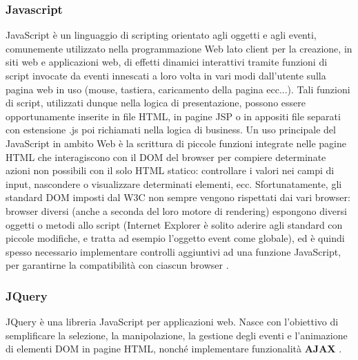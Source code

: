 \subsubsection{Javascript}
JavaScript è un linguaggio di scripting orientato agli oggetti e agli eventi, comunemente utilizzato nella programmazione Web lato client per la creazione, in siti web e applicazioni web, di effetti dinamici interattivi tramite funzioni di script invocate da eventi innescati a loro volta in vari modi dall'utente sulla pagina web in uso (mouse, tastiera, caricamento della pagina ecc...).
\newline
Tali funzioni di script, utilizzati dunque nella logica di presentazione, possono essere opportunamente inserite in file HTML, in pagine JSP o in appositi file separati con estensione .js poi richiamati nella logica di business. 
\newline
Un uso principale del JavaScript in ambito Web è la scrittura di piccole funzioni integrate nelle pagine HTML che interagiscono con il DOM del browser per compiere determinate azioni non possibili con il solo HTML statico: controllare i valori nei campi di input, nascondere o visualizzare determinati elementi, ecc.
\newline
Sfortunatamente, gli standard DOM imposti dal W3C non sempre vengono rispettati dai vari browser: browser diversi (anche a seconda del loro motore di rendering) espongono diversi oggetti o metodi allo script (Internet Explorer è solito aderire agli standard con piccole modifiche, e tratta ad esempio l'oggetto event come globale), ed è quindi spesso necessario implementare controlli aggiuntivi ad una funzione JavaScript, per garantirne la compatibilità con ciascun browser \cite{sito_Js}.

\subsubsection{JQuery}
JQuery è una libreria JavaScript per applicazioni web. Nasce con l'obiettivo di semplificare la selezione, la manipolazione, la gestione degli eventi e l'animazione di elementi DOM in pagine HTML, nonché implementare funzionalità \textbf{AJAX} \cite{sito_JQuery}.

